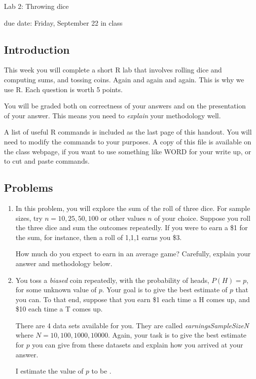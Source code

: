 \documentclass{report}
\begin{document}
{\bf \centerline{{\large Lab 2: Throwing dice}}}

\centerline{due date: Friday, September 22 in class}

\bigskip

\subsection*{Introduction}

This week you will complete a short R lab that involves rolling dice and computing sums,
and tossing coins.  Again and again and again.  This is why we use R.  Each question
is worth 5 points.

You will be graded both on correctness of your answers and on the presentation of
your answer.  This means you need to \emph{explain} your methodology well.

A list of useful R commands is included as the last page of this handout.  You will
need to modify the commands to your purposes.  A copy of this file is available
on the class webpage, if you want to use something like WORD for your write up, 
or to cut and paste commands.

\subsection*{Problems}

\begin{enumerate}

\item In this problem, you will explore the sum of the roll of three dice.
For sample sizes, try $n = 10, 25, 50, 100$ or other values $n$ of your choice.
Suppose you roll the three dice and sum the outcomes repeatedly.  If you
were to earn a \$1 for the sum, for instance, then a roll of 1,1,1 earns you
\$3. 

How much do you expect to earn in an average game?
Carefully, explain your answer and methodology below.

\newpage

\item You toss a \emph{biased} coin repeatedly, with the probability of
heads, $P (H) = p$, for some unknown value of $p$.  Your goal is to
give the best estimate of $p$ that you can.  To that end, suppose
that you earn \$1 each time a H comes up, and \$10 each time a T
comes up.

There are 4 data sets available for you.  They are called
\emph{earningsSampleSizeN} where $N = 10, 100, 1000, 10000$.
Again, your task is to give the best estimate for $p$ you can give from
these datasets and explain how you arrived at your answer.

I estimate the value of $p$ to be \underline{\hskip 2cm}.

\end{enumerate}
\end{document}
